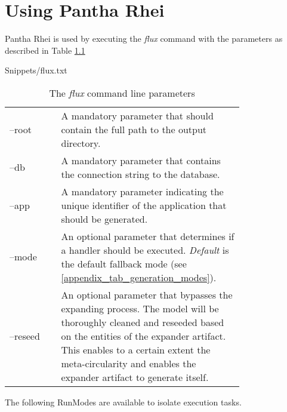 \chapter{Using Pantha Rhei} \label{appendix_run_flux}

Pantha Rhei is used by executing the \emph{flux} command with the parameters as described
in Table \ref{appendix_tab_commandline_parameters}


    {Snippets/flux.txt}

\begin{table}[H]
    \begin{tabular}{ l | p{0.78\linewidth}}
        \toprule
        --root & A mandatory parameter that should contain the full path to the output
        directory. \\
        --db & A mandatory parameter that contains the connection string to the database. \\
        --app & A mandatory parameter indicating the unique identifier of the application that should be generated. \\
        --mode & An optional parameter that determines if a handler should be executed.
        \emph{Default} is the default fallback mode (see \ref{appendix_tab_generation_modes}). \\
        --reseed & An optional parameter that bypasses the expanding process. The model will
        be thoroughly cleaned and reseeded based on the entities of the expander
        artifact. This enables to a certain extent the meta-circularity and enables the
        expander artifact to generate itself. \\
        \bottomrule
    \end{tabular}
    \caption{The \emph{flux} command line parameters}
    \label{appendix_tab_commandline_parameters}
\end{table}



The following RunModes are available to isolate execution tasks.

